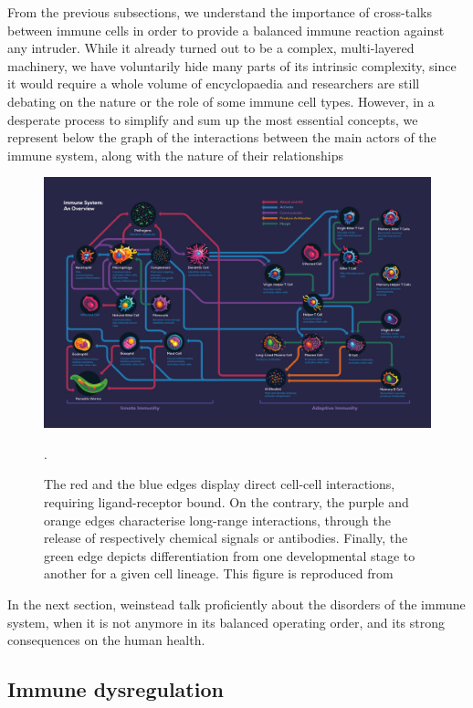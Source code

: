 From the previous subsections, we understand the importance of cross-talks between immune cells in order to provide a balanced immune reaction against any intruder. While it already turned out to be a complex, multi-layered machinery, we have voluntarily hide many parts of its intrinsic complexity, since it would require a whole volume of encyclopaedia and researchers are still debating on the nature or the role of some immune cell types. However, in a desperate process to simplify and sum up the most essential concepts, we represent below the graph of the interactions between the main actors of the immune system, along with the nature of their relationships  
\begin{figure}
    \centering
    \includegraphics[scale=0.5]{figures/summary-immune-system.jpg}
    \caption[\textbf{An overview of the immune system}]{The red and the blue edges display direct cell-cell interactions, requiring ligand-receptor bound. On the contrary, the purple and orange edges characterise long-range interactions, through the release of respectively chemical signals or antibodies. Finally, the green edge depicts differentiation from one developmental stage to another for a given cell lineage. This figure is reproduced from \autocite[Figure 1, Chapter 42]{dettmer21}}. 
    \label{fig:summary-immune-system}
\end{figure}

In the next section, weinstead talk proficiently about the disorders of the immune system, when it is not anymore in its balanced operating order, and its strong consequences on the human health.

\subsection{Immune dysregulation}

